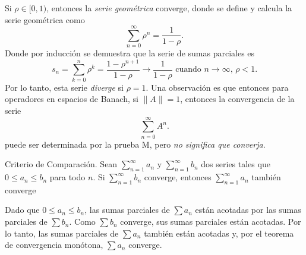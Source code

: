 \documentclass[main.tex]{subfiles}
\begin{document}
\eje Si \(\rho\in[0,1)\), entonces la \emph{serie geométrica} converge, donde se define y calcula la serie geométrica como
\[
\sum_{n=0}^{\infty}\rho^n=\frac{1}{1-\rho}.
\]
Donde por inducción se demuestra que la serie de sumas parciales es
\[
s_n=\sum_{k=0}^{n}\rho^k=\frac{1-\rho^{n+1}}{1-\rho}\to\frac{1}{1-\rho}\text{ cuando }n\to\infty,\,\rho<1.
\]
Por lo tanto, esta serie \emph{diverge} si \(\rho=1\). Una observación es que entonces para operadores en espacios de Banach, si \(\|A\|=1\), entonces la convergencia de la serie
\[
\sum_{n=0}^{\infty}A^n.
\]
 puede ser determinada por la prueba M, pero \emph{no significa que converja}.


\begin{prop}{Criterio de Comparación.}
Sean \(\sum_{n=1}^\infty a_n\) y \(\sum_{n=1}^\infty b_n\) dos series tales que \(0 \leq a_n \leq b_n\) para todo \(n\). Si \(\sum_{n=1}^\infty b_n\) converge, entonces \(\sum_{n=1}^\infty a_n\) también converge
\end{prop}
\dem Dado que \(0 \leq a_n \leq b_n\), las sumas parciales de \(\sum a_n\) están acotadas por las sumas parciales de \(\sum b_n\). Como \(\sum b_n\) converge, sus sumas parciales están acotadas. Por lo tanto, las sumas parciales de \(\sum a_n\) también están acotadas y, por el teorema de convergencia monótona, \(\sum a_n\) converge.
\end{document}

